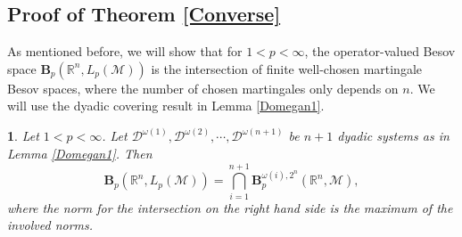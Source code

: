 \documentclass[oneside,english,a4wide]{amsart}
\numberwithin{equation}{section}
\numberwithin{figure}{section}
\theoremstyle{plain}
\theoremstyle{plain}
\newtheorem{prop}[thm]{\protect\propositionname}
\theoremstyle{definition}
\theoremstyle{plain}
\newtheorem{lem}[thm]{\protect\lemmaname}
\theoremstyle{remark}
\theoremstyle{definition}
\theoremstyle{remark}
\theoremstyle{definition}
\providecommand{\lemmaname}{Lemma}
\providecommand{\propositionname}{Proposition}
\newcommand{\8}{\infty}
\begin{document}



\smallskip




\subsection{Proof of Theorem \ref{Converse}}



As mentioned before, we will show that for $1<p<\infty$, the operator-valued Besov space $\pmb{B}_p(\mathbb{R}^n,L_p(\mathcal{M}))$ is the intersection of finite well-chosen martingale Besov spaces, where the number of chosen martingales only depends on $n$. We will use the dyadic covering result in Lemma \ref{Domegan1}.
\begin{prop}\label{pdayun}
	Let $1<p<\infty$. Let $\mathcal{D}^{\omega(1)}, \mathcal{D}^{\omega(2)}, \cdots, \mathcal{D}^{\omega(n+1)}$ be $n+1$ dyadic systems as in Lemma \ref{Domegan1}. Then
	$$  \pmb{B}_p(\mathbb{R}^n,L_p(\mathcal{M}))=\bigcap_{i=1}^{n+1}  \pmb{B}_p^{\omega(i),2^n}(\mathbb{R}^n,\mathcal{M}), $$
	where the norm for the intersection on the right hand side is the maximum of the involved norms.
\end{prop}
\end{document}

